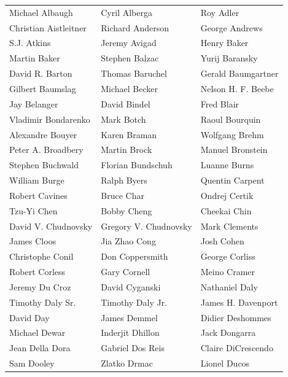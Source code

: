 \begin{tabular}{lll}
Michael Albaugh        & Cyril Alberga          & Roy Adler\\
Christian Aistleitner  & Richard Anderson       & George Andrews\\
S.J. Atkins            & Jeremy Avigad          & Henry Baker\\
Martin Baker           & Stephen Balzac         & Yurij Baransky\\
David R. Barton        & Thomas Baruchel        & Gerald Baumgartner\\
Gilbert Baumslag       & Michael Becker         & Nelson H. F. Beebe\\
Jay Belanger           & David Bindel           & Fred Blair\\
Vladimir Bondarenko    & Mark Botch             & Raoul Bourquin\\
Alexandre Bouyer       & Karen Braman           & Wolfgang Brehm\\
Peter A. Broadbery     & Martin Brock           & Manuel Bronstein\\
Stephen Buchwald       & Florian Bundschuh      & Luanne Burns\\
William Burge          & Ralph Byers            & Quentin Carpent\\
Robert Cavines         & Bruce Char             & Ondrej Certik\\
Tzu-Yi Chen            & Bobby Cheng            & Cheekai Chin\\
David V. Chudnovsky    & Gregory V. Chudnovsky  & Mark Clements\\
James Cloos            & Jia Zhao Cong          & Josh Cohen\\
Christophe Conil       & Don Coppersmith        & George Corliss\\
Robert Corless         & Gary Cornell           & Meino Cramer\\
Jeremy Du Croz         & David Cyganski         & Nathaniel Daly\\
Timothy Daly Sr.       & Timothy Daly Jr.       & James H. Davenport\\
David Day              & James Demmel           & Didier Deshommes\\
Michael Dewar          & Inderjit Dhillon       & Jack Dongarra\\
Jean Della Dora        & Gabriel Dos Reis       & Claire DiCrescendo\\
Sam Dooley             & Zlatko Drmac           & Lionel Ducos\\

\end{tabular}
